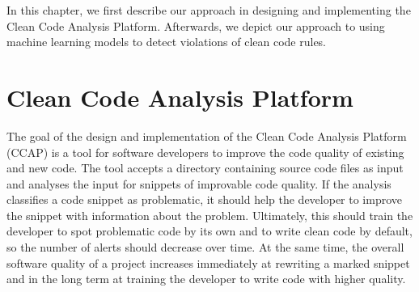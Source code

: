 In this chapter, we first describe our approach in designing and implementing the Clean Code Analysis Platform. Afterwards, we depict our approach to using machine learning models to detect violations of clean code rules.

\section{Clean Code Analysis Platform}
The goal of the design and implementation of the Clean Code Analysis Platform (CCAP) is a tool for software developers to improve the code quality of existing and new code. The tool accepts a directory containing source code files as input and analyses the input for snippets of improvable code quality. If the analysis classifies a code snippet as problematic, it should help the developer to improve the snippet with information about the problem. Ultimately, this should train the developer to spot problematic code by its own and to write clean code by default, so the number of alerts should decrease over time. At the same time, the overall software quality of a project increases immediately at rewriting a marked snippet and in the long term at training the developer to write code with higher quality.

